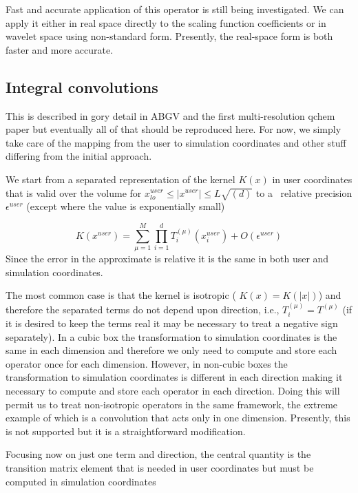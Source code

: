 \documentclass[letterpaper]{book}
\begin{document}
Fast and accurate application of this operator is still being investigated. We can apply it either in real space
directly to the scaling function coefficients or in wavelet space using non-standard form. Presently, the real-space
form is both faster and more accurate.

\subsection{Integral convolutions}
This is described in gory detail in ABGV and the first multi-resolution qchem paper but eventually all of that should be
reproduced here. For now, we simply take care of the mapping from the user to simulation coordinates and other stuff
differing from the initial approach.

We start from a separated representation of the kernel  $K(x)$ in user coordinates that is valid over the volume for 
$x_{\mathit{lo}}^{\mathit{user}}\le |x^{\mathit{user}}|\le L\sqrt{(d)}$ to a \ relative precision  $\epsilon
^{\mathit{user}}$ (except where the value is exponentially small) 

\begin{equation}
K(x^{\mathit{user}})=\sum _{\mu =1}^{M}{\prod _{i=1}^{d}{T_{i}^{(\mu )}(x_{i}^{\mathit{user}})}}+O(\epsilon
^{\mathit{user}})
\end{equation}
Since the error in the approximate is relative it is the same in both user and simulation coordinates.

The most common case is that the kernel is isotropic ( $K(x)=K(|x|)$) and therefore the separated terms do not depend
upon direction, i.e.,  $T_{i}^{(\mu )}=T^{(\mu )}$ (if it is desired to keep the terms real it may be necessary to
treat a negative sign separately). In a cubic box the transformation to simulation coordinates is the same in each
dimension and therefore we only need to compute and store each operator once for each dimension. However, in non-cubic
boxes the transformation to simulation coordinates is different in each direction making it necessary to compute and
store each operator in each direction. Doing this will permit us to treat non-isotropic operators in the same
framework, the extreme example of which is a convolution that acts only in one dimension. Presently, this is not
supported but it is a straightforward modification.

Focusing now on just one term and direction, the central quantity is the transition matrix element that is needed in
user coordinates but must be computed in simulation coordinates 
\end{document}
